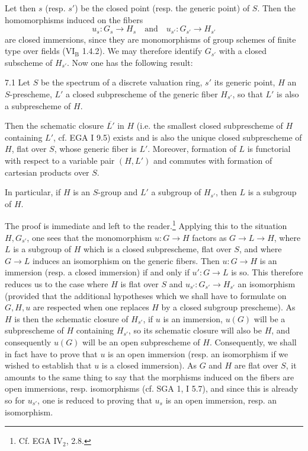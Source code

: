 Let then $s$ (resp. $s'$) be the closed point (resp. the generic point) of $S$. Then the homomorphisms induced on the fibers
\[
u_s:G_s\to H_s\quad\text{and}\quad u_{s'}:G_{s'}\to H_{s'}
\]
are closed immersions, since they are monomorphisms of group schemes of finite type over fields (VI$_{\mathrm B}$ 1.4.2). We may therefore identify $G_{s'}$ with a closed subscheme of $H_{s'}$. Now one has the following result:
\begin{lemma}{7.1}\label{VIII.7.1}
Let $S$ be the spectrum of a discrete valuation ring, $s'$ its generic point, $H$ an $S$-prescheme, $L'$ a closed subprescheme of the generic fiber $H_{s'}$, so that $L'$ is also a subprescheme of $H$.

Then the schematic closure $\overline{L'}$ in $H$ (i.e. the smallest closed subprescheme of $H$ containing $L'$, cf. EGA I 9.5) exists and is also the unique closed subprescheme of $H$, flat over $S$, whose generic fiber is $L'$. Moreover, formation of $L$ is functorial with respect to a variable pair $(H,L')$ and commutes with formation of cartesian products over $S$.

In particular, if $H$ is an $S$-group and $L'$ a subgroup of $H_{s'}$, then $L$ is a subgroup of $H$.
\end{lemma}
The proof is immediate and left to the reader.\footnote{Cf. EGA IV$_2$, 2.8.} Applying this to the situation $H,G_{s'}$, one sees that the monomorphism $u:G\to H$ factors as $G\to L\to H$, where $L$ is a subgroup of $H$ which is a closed subprescheme, flat over $S$, and where $G\to L$ induces an isomorphism on the generic fibers. Then $u:G\to H$ is an immersion (resp. a closed immersion) if and only if $u':G\to L$ is so. This therefore reduces us to the case where $H$ is flat over $S$ and $u_{s'}:G_{s'}\to H_{s'}$ an isomorphism (provided that the additional hypotheses which we shall have to formulate on $G,H,u$ are respected when one replaces $H$ by a closed subgroup prescheme). As $H$ is then the schematic closure of $H_{s'}$, if $u$ is an immersion, $u(G)$ will be a subprescheme of $H$ containing $H_{s'}$, so its schematic closure will also be $H$, and consequently $u(G)$ will be an open subprescheme of $H$. Consequently, we shall in fact have to prove that $u$ is an open immersion (resp. an isomorphism if we wished to establish that $u$ is a closed immersion). As $G$ and $H$ are flat over $S$, it amounts to the same thing to say that the morphisms induced on the fibers are open immersions, resp. isomorphisms (cf. SGA 1, I 5.7), and since this is already so for $u_{s'}$, one is reduced to proving that $u_s$ is an open immersion, resp. an isomorphism.
